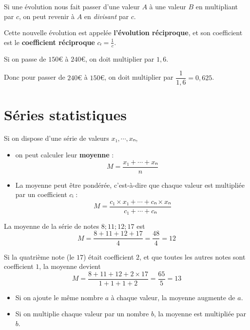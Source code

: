 \documentclass[
	classe=$2^{de}$
]{coursclass}
\begin{document}
\begin{propriete}
	Si une évolution nous fait passer d'une valeur $A$ à une valeur $B$ en multipliant par $c$, on peut revenir à $A$ en \textit{divisant} par $c$.

	Cette nouvelle évolution est appelée \textbf{l'évolution réciproque}, et son coefficient est le \textbf{coefficient réciproque} $cᵣ = \frac{1}{c}$.
\end{propriete}

\begin{exemple}
	Si on passe de $150€$ à $240€$, on doit multiplier par $1,6$. \medskip

	Donc pour passer de $240€$ à $150€$, on doit multiplier par $\dfrac{1}{1,6} = 0,625$.
\end{exemple}

\section{Séries statistiques}

\begin{definition}
	Si on dispose d'une série de valeurs $x₁, ⋯, xₙ$,
	\begin{itemize}
		\item on peut calculer leur \textbf{moyenne} :
		      $$ M = \dfrac{x₁ + ⋯ + xₙ}{n} $$
		\item La moyenne peut être pondérée, c'est-à-dire que chaque valeur est multipliée par un coefficient $cᵢ$ :
		      $$ M = \dfrac{c₁ × x₁ + ⋯ + cₙ × xₙ}{c₁ + ⋯ + cₙ} $$
	\end{itemize}
\end{definition}

\begin{exemple}
	La moyenne de la série de notes $8 ; 11 ; 12 ; 17$ est
	$$ M = \dfrac{8 + 11 + 12 + 17}{4} = \dfrac{48}{4} = 12 $$

	Si la quatrième note (le $17$) était coefficient $2$, et que toutes les autres notes sont coefficient $1$, la moyenne devient
	$$ M = \dfrac{8 + 11 + 12 + 2 × 17}{1 + 1 + 1 + 2} = \dfrac{65}{5} = 13 $$
\end{exemple}

\begin{propriete}
	\begin{itemize}
		\item Si on ajoute le même nombre $a$ à chaque valeur, la moyenne augmente de $a$.
		\item Si on multiplie chaque valeur par un nombre $b$, la moyenne est multipliée par $b$.
	\end{itemize}
\end{propriete}
\end{document}
